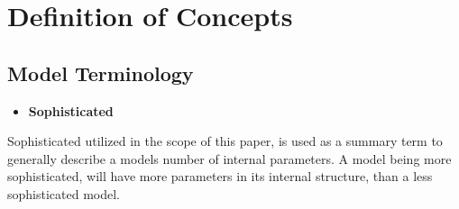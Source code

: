 \section{Definition of Concepts}\label{sec:definitions}

\subsection{Model Terminology}

\begin{itemize}
    \item \textbf{Sophisticated}
\end{itemize}

Sophisticated utilized in the scope of this paper, is used as a summary term to generally describe a models number of internal
parameters. A model being more sophisticated, will have more parameters in its internal structure, than a less sophisticated model.




\newpage